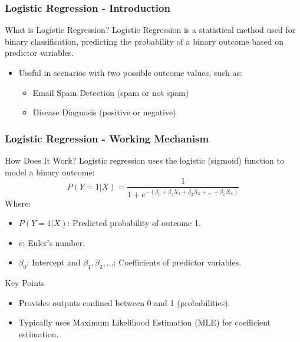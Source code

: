 \documentclass[aspectratio=169]{beamer}
\begin{document}
\begin{frame}[fragile]
    \frametitle{Logistic Regression - Introduction}
    \begin{block}{What is Logistic Regression?}
        Logistic Regression is a statistical method used for binary classification, predicting the probability of a binary outcome based on predictor variables.
    \end{block}
    
    \begin{itemize}
        \item Useful in scenarios with two possible outcome values, such as:
            \begin{itemize}
                \item Email Spam Detection (spam or not spam)
                \item Disease Diagnosis (positive or negative)
            \end{itemize}
    \end{itemize}
\end{frame}

\begin{frame}[fragile]
    \frametitle{Logistic Regression - Working Mechanism}
    
    \begin{block}{How Does It Work?}
        Logistic regression uses the logistic (sigmoid) function to model a binary outcome:
        \begin{equation}
            P(Y=1|X) = \frac{1}{1 + e^{-(\beta_0 + \beta_1X_1 + \beta_2X_2 + ... + \beta_nX_n)}}
        \end{equation}
        Where:
        \begin{itemize}
            \item $P(Y=1|X)$: Predicted probability of outcome 1.
            \item $e$: Euler's number.
            \item $\beta_0$: Intercept and $\beta_1, \beta_2, ...$: Coefficients of predictor variables.
        \end{itemize}
    \end{block}
    
    \begin{block}{Key Points}
        \begin{itemize}
            \item Provides outputs confined between 0 and 1 (probabilities).
            \item Typically uses Maximum Likelihood Estimation (MLE) for coefficient estimation.
        \end{itemize}
    \end{block}
\end{frame}
\end{document}
